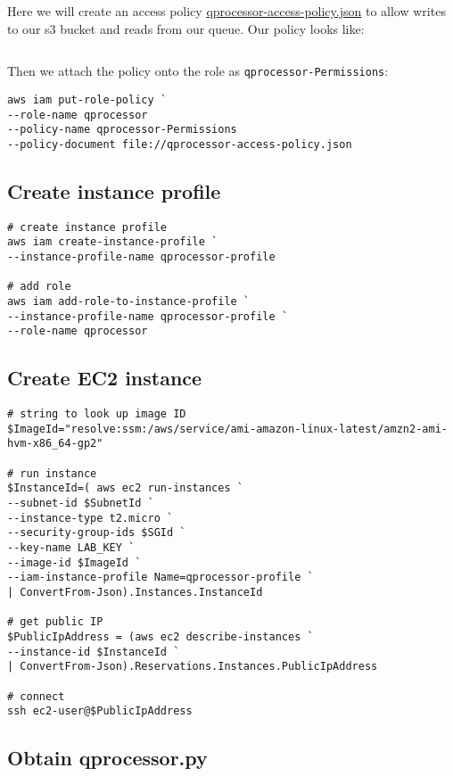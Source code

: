 Here we will create an access policy \url{qprocessor-access-policy.json} to allow writes to our s3 bucket and reads from our queue.
Our policy looks like:

\inputminted{json}{qprocessor-access-policy.json}

Then we attach the policy onto the role as \texttt{qprocessor-Permissions}:

\begin{verbatim}
aws iam put-role-policy `
--role-name qprocessor
--policy-name qprocessor-Permissions
--policy-document file://qprocessor-access-policy.json
\end{verbatim}

\subsection{Create instance profile}

\begin{verbatim}
# create instance profile
aws iam create-instance-profile `
--instance-profile-name qprocessor-profile

# add role
aws iam add-role-to-instance-profile `
--instance-profile-name qprocessor-profile `
--role-name qprocessor
\end{verbatim}

\subsection{Create EC2 instance}

\begin{verbatim}
# string to look up image ID
$ImageId="resolve:ssm:/aws/service/ami-amazon-linux-latest/amzn2-ami-hvm-x86_64-gp2"

# run instance
$InstanceId=( aws ec2 run-instances `
--subnet-id $SubnetId `
--instance-type t2.micro `
--security-group-ids $SGId `
--key-name LAB_KEY `
--image-id $ImageId `
--iam-instance-profile Name=qprocessor-profile `
| ConvertFrom-Json).Instances.InstanceId 

# get public IP
$PublicIpAddress = (aws ec2 describe-instances `
--instance-id $InstanceId `
| ConvertFrom-Json).Reservations.Instances.PublicIpAddress

# connect
ssh ec2-user@$PublicIpAddress
\end{verbatim}

\subsection{Obtain qprocessor.py}

